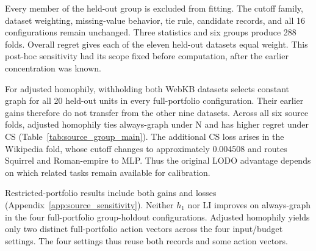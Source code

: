 Every member of the held-out group is excluded from fitting. The cutoff family, dataset weighting, missing-value behavior, tie rule, candidate records, and all 16 configurations remain unchanged. Three statistics and six groups produce 288 folds. Overall regret gives each of the eleven held-out datasets equal weight. This post-hoc sensitivity had its scope fixed before computation, after the earlier concentration was known.



For adjusted homophily, withholding both WebKB datasets selects constant graph for all 20 held-out units in every full-portfolio configuration. Their earlier gains therefore do not transfer from the other nine datasets. Across all six source folds, adjusted homophily ties always-graph under N and has higher regret under CS (Table~\ref{tab:source_group_main}). The additional CS loss arises in the Wikipedia fold, whose cutoff changes to approximately 0.004508 and routes Squirrel and Roman-empire to MLP. Thus the original LODO advantage depends on which related tasks remain available for calibration.

Restricted-portfolio results include both gains and losses (Appendix~\ref{app:source_sensitivity}). Neither $h_1$ nor LI improves on always-graph in the four full-portfolio group-holdout configurations. Adjusted homophily yields only two distinct full-portfolio action vectors across the four input/budget settings. The four settings thus reuse both records and some action vectors.
